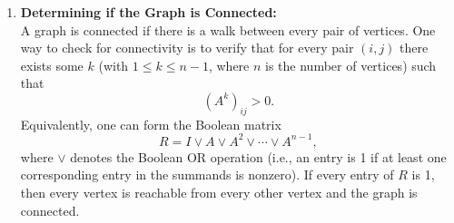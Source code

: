 \documentclass[a4paper,12pt]{article}
\begin{document}
\begin{enumerate}
    \item \textbf{Determining if the Graph is Connected:} \\
    A graph is connected if there is a walk between every pair of vertices. One way to check for connectivity is to verify that for every pair \( (i,j) \) there exists some \( k \) (with \( 1 \le k \le n-1 \), where \( n \) is the number of vertices) such that
    \[
    (A^k)_{ij} > 0.
    \]
    Equivalently, one can form the Boolean matrix
    \[
    R = I \vee A \vee A^2 \vee \cdots \vee A^{n-1},
    \]
    where \( \vee \) denotes the Boolean OR operation (i.e., an entry is 1 if at least one corresponding entry in the summands is nonzero). If every entry of \( R \) is 1, then every vertex is reachable from every other vertex and the graph is connected.

\end{enumerate}




\end{document}
